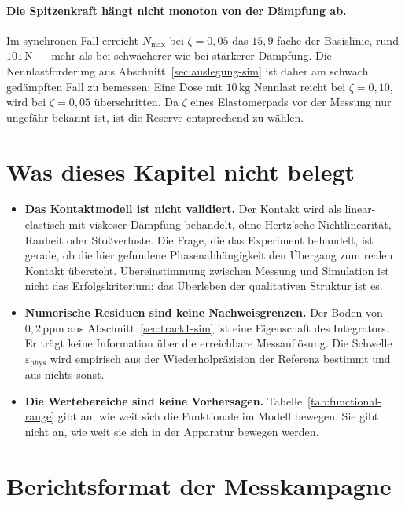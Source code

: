 \documentclass[12pt,a4paper]{report}
\begin{document}
\paragraph{Die Spitzenkraft hängt nicht monoton von der Dämpfung ab.}
Im synchronen Fall erreicht $N_{\max}$ bei $\zeta = 0{,}05$ das
$15{,}9$-fache der Basislinie, rund $101\,\mathrm{N}$ --- mehr als bei
schwächerer wie bei stärkerer Dämpfung. Die Nennlastforderung aus
Abschnitt~\ref{sec:auslegung-sim} ist daher am schwach gedämpften
Fall zu bemessen: Eine Dose mit $10\,\mathrm{kg}$ Nennlast reicht bei
$\zeta = 0{,}10$, wird bei $\zeta = 0{,}05$ überschritten. Da $\zeta$
eines Elastomerpads vor der Messung nur ungefähr bekannt ist, ist die
Reserve entsprechend zu wählen.

\section{Was dieses Kapitel nicht belegt}

\begin{itemize}
  \item \textbf{Das Kontaktmodell ist nicht validiert.} Der Kontakt wird
        als linear-elastisch mit viskoser Dämpfung behandelt, ohne
        Hertz'sche Nichtlinearität, Rauheit oder Stoßverluste. Die Frage,
        die das Experiment behandelt, ist gerade, ob die hier gefundene
        Phasenabhängigkeit den Übergang zum realen Kontakt übersteht.
        Übereinstimmung zwischen Messung und Simulation ist nicht das
        Erfolgskriterium; das Überleben der qualitativen Struktur ist es.
  \item \textbf{Numerische Residuen sind keine Nachweisgrenzen.} Der
        Boden von $0{,}2\,\mathrm{ppm}$ aus
        Abschnitt~\ref{sec:track1-sim} ist eine Eigenschaft des
        Integrators. Er trägt keine Information über die erreichbare
        Messauflösung. Die Schwelle $\varepsilon_{\mathrm{phys}}$ wird
        empirisch aus der Wiederholpräzision der Referenz bestimmt und
        aus nichts sonst.
  \item \textbf{Die Wertebereiche sind keine Vorhersagen.}
        Tabelle~\ref{tab:functional-range} gibt an, wie weit sich die
        Funktionale im Modell bewegen. Sie gibt nicht an, wie weit sie
        sich in der Apparatur bewegen werden.
\end{itemize}

\section{Berichtsformat der Messkampagne}
\end{document}

